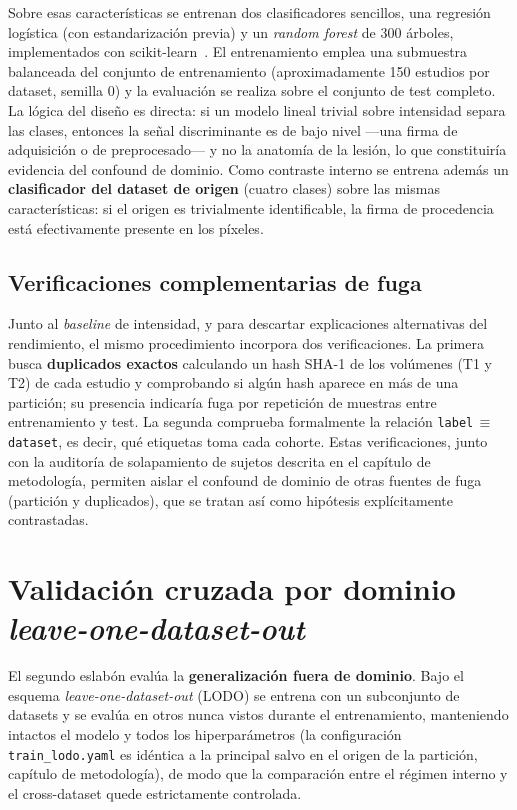 Sobre esas características se entrenan dos clasificadores sencillos, una
regresión logística (con estandarización previa) y un \emph{random forest} de
300 árboles, implementados con scikit-learn~\cite{pedregosa2011sklearn}. El
entrenamiento emplea una submuestra balanceada del conjunto de entrenamiento
(aproximadamente 150 estudios por dataset, semilla $0$) y la evaluación se
realiza sobre el conjunto de test completo. La lógica del diseño es directa: si
un modelo lineal trivial sobre intensidad separa las clases, entonces la señal
discriminante es de bajo nivel ---una firma de adquisición o de preprocesado---
y no la anatomía de la lesión, lo que constituiría evidencia del confound de
dominio. Como contraste interno se entrena además un \textbf{clasificador del
dataset de origen} (cuatro clases) sobre las mismas características: si el origen
es trivialmente identificable, la firma de procedencia está efectivamente
presente en los píxeles.

\subsection{Verificaciones complementarias de fuga}

Junto al \emph{baseline} de intensidad, y para descartar explicaciones
alternativas del rendimiento, el mismo procedimiento incorpora dos
verificaciones. La primera busca \textbf{duplicados exactos} calculando un hash
SHA-1 de los volúmenes (T1 y T2) de cada estudio y comprobando si algún hash
aparece en más de una partición; su presencia indicaría fuga por repetición de
muestras entre entrenamiento y test. La segunda comprueba formalmente la
relación \texttt{label}\,$\equiv$\,\texttt{dataset}, es decir, qué etiquetas
toma cada cohorte. Estas verificaciones, junto con la auditoría de solapamiento
de sujetos descrita en el capítulo de metodología, permiten aislar el confound
de dominio de otras fuentes de fuga (partición y duplicados), que se tratan así
como hipótesis explícitamente contrastadas.

\section{Validación cruzada por dominio \emph{leave-one-dataset-out}}

El segundo eslabón evalúa la \textbf{generalización fuera de dominio}. Bajo el
esquema \emph{leave-one-dataset-out} (LODO) se entrena con un subconjunto de
datasets y se evalúa en otros nunca vistos durante el entrenamiento,
manteniendo intactos el modelo y todos los hiperparámetros (la configuración
\texttt{train\_lodo.yaml} es idéntica a la principal salvo en el origen de la
partición, capítulo de metodología), de modo que la comparación entre el régimen
interno y el cross-dataset quede estrictamente controlada.

